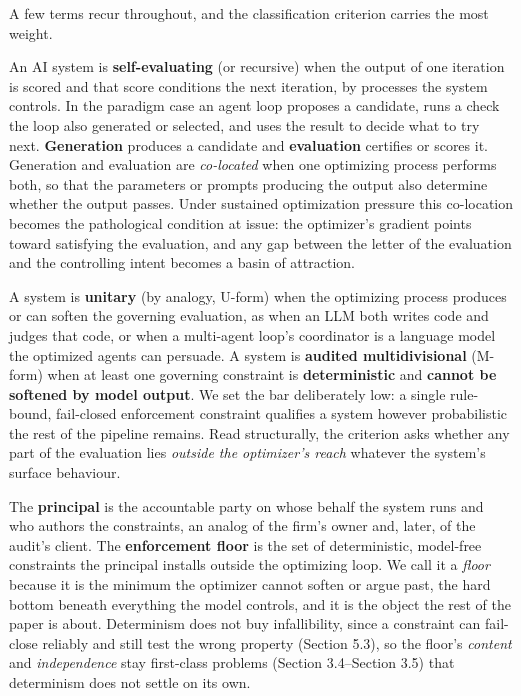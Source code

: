 \documentclass[11pt]{article}
\begin{document}
A few terms recur throughout, and the classification criterion carries the most weight.

An AI system is \textbf{self-evaluating} (or recursive) when the output of one iteration is scored and that score conditions the next iteration, by processes the system controls. In the paradigm case an agent loop proposes a candidate, runs a check the loop also generated or selected, and uses the result to decide what to try next. \textbf{Generation} produces a candidate and \textbf{evaluation} certifies or scores it. Generation and evaluation are \emph{co-located} when one optimizing process performs both, so that the parameters or prompts producing the output also determine whether the output passes. Under sustained optimization pressure this co-location becomes the pathological condition at issue: the optimizer's gradient points toward satisfying the evaluation, and any gap between the letter of the evaluation and the controlling intent becomes a basin of attraction.

A system is \textbf{unitary} (by analogy, U-form) when the optimizing process produces or can soften the governing evaluation, as when an LLM both writes code and judges that code, or when a multi-agent loop's coordinator is a language model the optimized agents can persuade. A system is \textbf{audited multidivisional} (M-form) when at least one governing constraint is \textbf{deterministic} and \textbf{cannot be softened by model output}. We set the bar deliberately low: a single rule-bound, fail-closed enforcement constraint qualifies a system however probabilistic the rest of the pipeline remains. Read structurally, the criterion asks whether any part of the evaluation lies \emph{outside the optimizer's reach} whatever the system's surface behaviour.

The \textbf{principal} is the accountable party on whose behalf the system runs and who authors the constraints, an analog of the firm's owner and, later, of the audit's client. The \textbf{enforcement floor} is the set of deterministic, model-free constraints the principal installs outside the optimizing loop. We call it a \emph{floor} because it is the minimum the optimizer cannot soften or argue past, the hard bottom beneath everything the model controls, and it is the object the rest of the paper is about. Determinism does not buy infallibility, since a constraint can fail-close reliably and still test the wrong property (Section 5.3), so the floor's \emph{content} and \emph{independence} stay first-class problems (Section 3.4--Section 3.5) that determinism does not settle on its own.
\end{document}
